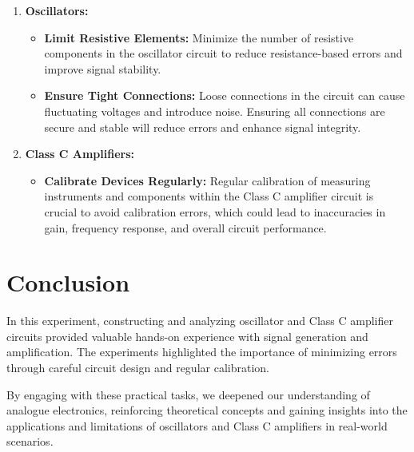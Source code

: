 \documentclass[12pt,a4paper]{article}
\begin{document}
    \begin{enumerate}
        \item \textbf{Oscillators:}
        \begin{itemize}
            \item \textbf{Limit Resistive Elements:} Minimize the number of resistive components in the oscillator circuit to reduce resistance-based errors and improve signal stability.
            \item \textbf{Ensure Tight Connections:} Loose connections in the circuit can cause fluctuating voltages and introduce noise. Ensuring all connections are secure and stable will reduce errors and enhance signal integrity.
        \end{itemize}
        
        \item \textbf{Class C Amplifiers:}
        \begin{itemize}
            \item \textbf{Calibrate Devices Regularly:} Regular calibration of measuring instruments and components within the Class C amplifier circuit is crucial to avoid calibration errors, which could lead to inaccuracies in gain, frequency response, and overall circuit performance.
        \end{itemize}
    \end{enumerate}

    \section{Conclusion}

    In this experiment, constructing and analyzing oscillator and Class C amplifier circuits provided valuable hands-on experience with signal generation and amplification. The experiments highlighted the importance of minimizing errors through careful circuit design and regular calibration.

    By engaging with these practical tasks, we deepened our understanding of analogue electronics, reinforcing theoretical concepts and gaining insights into the applications and limitations of oscillators and Class C amplifiers in real-world scenarios.

    \nocite{*}
    
    
\end{document}
